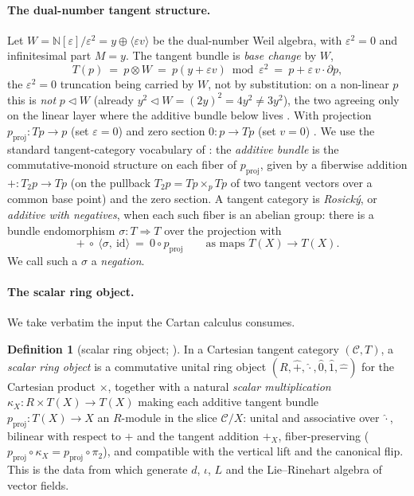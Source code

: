 \documentclass[11pt]{article}
\theoremstyle{definition}
\newtheorem{definition}[theorem]{Definition}
\newcommand{\N}{\mathbb{N}}
\newcommand{\id}{\mathrm{id}}
\begin{document}
\paragraph{The dual-number tangent structure.}
Let $W=\N[\varepsilon]/\varepsilon^2=y\oplus\langle\varepsilon v\rangle$ be the dual-number Weil
algebra, with $\varepsilon^2=0$ and infinitesimal part $M=y$. The tangent bundle is \emph{base
change} by $W$,
\[
   T(p)\ =\ p\otimes W\ =\ p(y+\varepsilon v)\bmod\varepsilon^2\ =\ p + \varepsilon\, v\cdot
   \partial p ,
\]
the $\varepsilon^2=0$ truncation being carried by $W$, not by substitution: on a non-linear $p$ this
is \emph{not} $p\lhd W$ (already $y^2\lhd W=(2y)^2=4y^2\neq 3y^2$), the two agreeing only on the
linear layer where the additive bundle below lives \cite{MacBethUniqueness}. With
projection $p_{\mathrm{proj}}:Tp\to p$ (set $\varepsilon=0$) and zero section
$0:p\to Tp$ (set $v=0$) \cite{MacBethTangent}. We use the standard tangent-category
vocabulary of \cite{CockettCruttwell2014}: the \emph{additive bundle} is the
commutative-monoid structure on each fiber of $p_{\mathrm{proj}}$, given by a fiberwise
addition $+:T_2p\to Tp$ (on the pullback $T_2p=Tp\times_p Tp$ of two tangent vectors over a
common base point) and the zero section. A tangent category is \emph{Rosick\'y}, or
\emph{additive with negatives}, when each such fiber is an abelian group: there is a bundle
endomorphism $\sigma:T\Rightarrow T$ over the projection with
\begin{equation}
   +\ \circ\ \langle \sigma,\ \id\rangle\ =\ 0\circ p_{\mathrm{proj}}
   \qquad\text{as maps } T(X)\to T(X). \tag{$\dagger$}\label{eq:neg}
\end{equation}
We call such a $\sigma$ a \emph{negation}.

\paragraph{The scalar ring object.}
We take verbatim the input the Cartan calculus consumes.

\begin{definition}[scalar ring object; {\cite[\S4]{AintablianBlohmann2026}}]
\label{def:scalar-ring}
In a Cartesian tangent category $(\mathcal C, T)$, a \emph{scalar ring object} is a
commutative unital ring object $(R,\hat+,\hat\cdot,\hat 0,\hat 1,\hat-)$ for the Cartesian
product $\times$, together with a natural \emph{scalar multiplication} $\kappa_X:R\times
T(X)\to T(X)$ making each additive tangent bundle $p_{\mathrm{proj}}:T(X)\to X$ an
$R$-module in the slice $\mathcal C/X$: unital and associative over $\hat\cdot$, bilinear
with respect to $\hat+$ and the tangent addition $+_X$, fiber-preserving
($p_{\mathrm{proj}}\circ\kappa_X=p_{\mathrm{proj}}\circ\pi_2$), and compatible with the
vertical lift and the canonical flip. This is the data from which
\cite{AintablianBlohmann2026} generate $d$, $\iota$, $L$ and the Lie--Rinehart algebra of
vector fields.
\end{definition}
\end{document}
